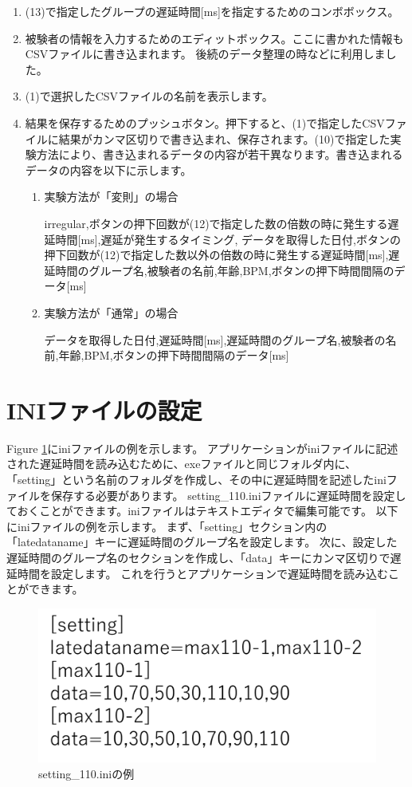 \documentclass{article} %
\begin{document}
\begin{enumerate}[label=(\arabic*), leftmargin=*]
  \item (13)で指定したグループの遅延時間[ms]を指定するためのコンボボックス。
  \item 被験者の情報を入力するためのエディットボックス。ここに書かれた情報もCSVファイルに書き込まれます。
  後続のデータ整理の時などに利用しました。
  \item (1)で選択したCSVファイルの名前を表示します。
  \item 結果を保存するためのプッシュボタン。押下すると、(1)で指定したCSVファイルに結果がカンマ区切りで書き込まれ、保存されます。(10)で指定した実験方法により、書き込まれるデータの内容が若干異なります。書き込まれるデータの内容を以下に示します。
  \begin{enumerate}
    \item 実験方法が「変則」の場合
    
    irregular,ボタンの押下回数が(12)で指定した数の倍数の時に発生する遅延時間[ms],遅延が発生するタイミング, データを取得した日付,ボタンの押下回数が(12)で指定した数以外の倍数の時に発生する遅延時間[ms],遅延時間のグループ名,被験者の名前,年齢,BPM,ボタンの押下時間間隔のデータ[ms]
    \item 実験方法が「通常」の場合
    
    データを取得した日付,遅延時間[ms],遅延時間のグループ名,被験者の名前,年齢,BPM,ボタンの押下時間間隔のデータ[ms]
  \end{enumerate}
\end{enumerate}
\newpage
\section{INIファイルの設定}
Figure \ref{fig:ini-file}にiniファイルの例を示します。
アプリケーションがiniファイルに記述された遅延時間を読み込むために、exeファイルと同じフォルダ内に、
「setting」という名前のフォルダを作成し、その中に遅延時間を記述したiniファイルを保存する必要があります。
setting\_110.iniファイルに遅延時間を設定しておくことができます。iniファイルはテキストエディタで編集可能です。
以下にiniファイルの例を示します。
まず、「setting」セクション内の「latedataname」キーに遅延時間のグループ名を設定します。
次に、設定した遅延時間のグループ名のセクションを作成し、「data」キーにカンマ区切りで遅延時間を設定します。
これを行うとアプリケーションで遅延時間を読み込むことができます。
\begin{figure}[tbp]
  \centering
  \includegraphics[scale=0.3]{setting-ini.pdf}
  \caption{setting\_110.iniの例}
  \label{fig:ini-file}
\end{figure}
\end{document}
